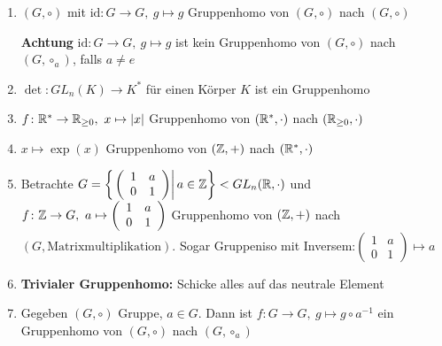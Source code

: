 \documentclass[12pt,a4paper]{scrartcl}
\begin{document}
\begin{bsp}[Gruppenhomos]
	\leavevmode
	\begin{enumerate}
		\item $(G,\circ)$ mit $\mbox{id}\colon G\to G,\ g\mapsto g$ Gruppenhomo von $(G,\circ)$ nach $(G,\circ)$
		
		\textbf{Achtung} $\mbox{id}\colon G\to G,\ g\mapsto g$ ist kein Gruppenhomo von $(G,\circ)$ nach $(G,\circ_a)$, falls $a\neq e$
		
		\item $\det\colon GL_n(K)\to K^*$ für einen Körper $K$ ist ein Gruppenhomo
		\item $f\colon \IR^*\to \IR_{\geq 0},\ x\mapsto |x|$ Gruppenhomo von $(\mathbb R^*,\cdot)$ nach $(\mathbb R_{\geq 0}, \cdot)$
		\item $x\mapsto \exp(x)$ Gruppenhomo von $(\mathbb Z,+)$ nach $(\mathbb R^*,\cdot)$
		\item Betrachte $G = \left\{\left.\left(\begin{array}{cc}
		1 & a \\ 
		0 & 1
		\end{array} \right)\right\vert a\in\mathbb Z\right\}<GL_n(\mathbb R,\cdot)$ und $f\colon \mathbb Z\to G,\ a\mapsto\left(\begin{array}{cc}
		1 & a \\ 
		0 & 1
		\end{array} \right)$ Gruppenhomo von $(\mathbb Z,+)$ nach $(G,\mbox{Matrixmultiplikation})$. Sogar Gruppeniso mit Inversem:$\left(\begin{array}{cc}
		1 & a \\ 
		0 & 1
		\end{array} \right)\mapsto a$
		\item \textbf{Trivialer Gruppenhomo:} Schicke alles auf das neutrale Element
		\item Gegeben $(G,\circ)$ Gruppe, $a\in G$. Dann ist $f\colon G\to G,\ g\mapsto g\circ a^{-1}$ ein Gruppenhomo von $(G,\circ)$ nach $(G,\circ_a)$
	\end{enumerate}
\end{bsp}
\end{document}
